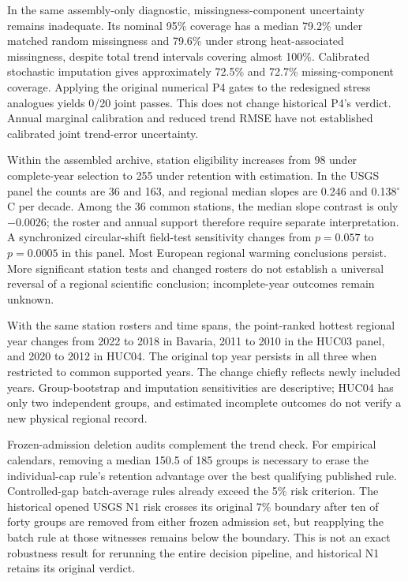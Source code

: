 \documentclass[draft,linenumbers]{agujournal2025}
\begin{document}
In the same assembly-only diagnostic, missingness-component uncertainty remains inadequate. Its nominal 95\% coverage has a median 79.2\% under matched random missingness and 79.6\% under strong heat-associated missingness, despite total trend intervals covering almost 100\%. Calibrated stochastic imputation gives approximately 72.5\% and 72.7\% missing-component coverage. Applying the original numerical P4 gates to the redesigned stress analogues yields 0/20 joint passes. This does not change historical P4's verdict. Annual marginal calibration and reduced trend RMSE have not established calibrated joint trend-error uncertainty.

Within the assembled archive, station eligibility increases from 98 under complete-year selection to 255 under retention with estimation. In the USGS panel the counts are 36 and 163, and regional median slopes are 0.246 and 0.138$^{\circ}$C per decade. Among the 36 common stations, the median slope contrast is only $-0.0026$; the roster and annual support therefore require separate interpretation. A synchronized circular-shift field-test sensitivity changes from $p=0.057$ to $p=0.0005$ in this panel. Most European regional warming conclusions persist. More significant station tests and changed rosters do not establish a universal reversal of a regional scientific conclusion; incomplete-year outcomes remain unknown.

With the same station rosters and time spans, the point-ranked hottest regional year changes from 2022 to 2018 in Bavaria, 2011 to 2010 in the HUC03 panel, and 2020 to 2012 in HUC04. The original top year persists in all three when restricted to common supported years. The change chiefly reflects newly included years. Group-bootstrap and imputation sensitivities are descriptive; HUC04 has only two independent groups, and estimated incomplete outcomes do not verify a new physical regional record.

Frozen-admission deletion audits complement the trend check. For empirical calendars, removing a median 150.5 of 185 groups is necessary to erase the individual-cap rule's retention advantage over the best qualifying published rule. Controlled-gap batch-average rules already exceed the 5\% risk criterion. The historical opened USGS N1 risk crosses its original 7\% boundary after ten of forty groups are removed from either frozen admission set, but reapplying the batch rule at those witnesses remains below the boundary. This is not an exact robustness result for rerunning the entire decision pipeline, and historical N1 retains its original verdict.
\end{document}
